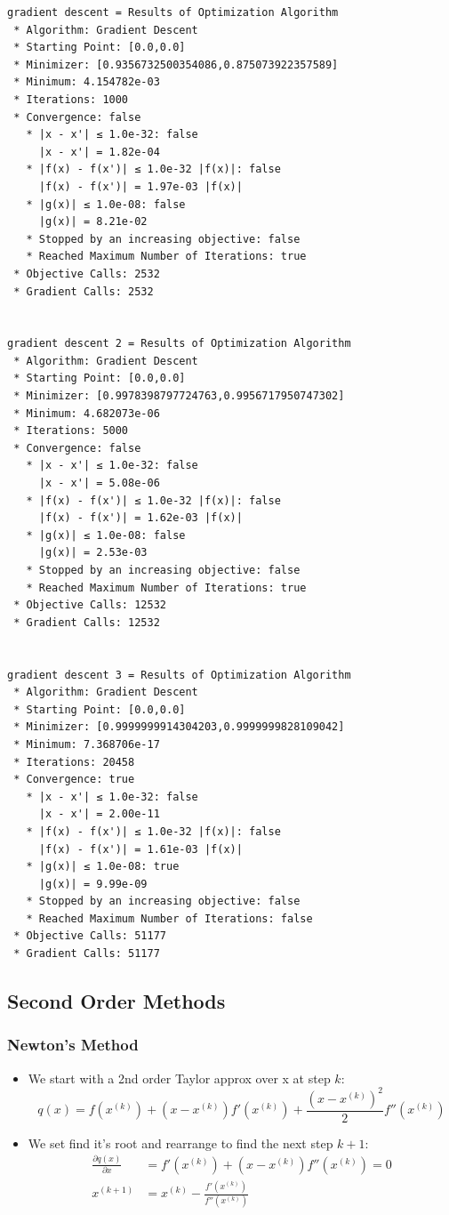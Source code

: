 \documentclass[11pt]{article}
\providecommand{\tightlist}{%
      \setlength{\itemsep}{0pt}\setlength{\parskip}{0pt}}
\begin{document}
    \begin{Verbatim}[commandchars=\\\{\}]
gradient descent = Results of Optimization Algorithm
 * Algorithm: Gradient Descent
 * Starting Point: [0.0,0.0]
 * Minimizer: [0.9356732500354086,0.875073922357589]
 * Minimum: 4.154782e-03
 * Iterations: 1000
 * Convergence: false
   * |x - x'| ≤ 1.0e-32: false 
     |x - x'| = 1.82e-04 
   * |f(x) - f(x')| ≤ 1.0e-32 |f(x)|: false
     |f(x) - f(x')| = 1.97e-03 |f(x)|
   * |g(x)| ≤ 1.0e-08: false 
     |g(x)| = 8.21e-02 
   * Stopped by an increasing objective: false
   * Reached Maximum Number of Iterations: true
 * Objective Calls: 2532
 * Gradient Calls: 2532


gradient descent 2 = Results of Optimization Algorithm
 * Algorithm: Gradient Descent
 * Starting Point: [0.0,0.0]
 * Minimizer: [0.9978398797724763,0.9956717950747302]
 * Minimum: 4.682073e-06
 * Iterations: 5000
 * Convergence: false
   * |x - x'| ≤ 1.0e-32: false 
     |x - x'| = 5.08e-06 
   * |f(x) - f(x')| ≤ 1.0e-32 |f(x)|: false
     |f(x) - f(x')| = 1.62e-03 |f(x)|
   * |g(x)| ≤ 1.0e-08: false 
     |g(x)| = 2.53e-03 
   * Stopped by an increasing objective: false
   * Reached Maximum Number of Iterations: true
 * Objective Calls: 12532
 * Gradient Calls: 12532


gradient descent 3 = Results of Optimization Algorithm
 * Algorithm: Gradient Descent
 * Starting Point: [0.0,0.0]
 * Minimizer: [0.9999999914304203,0.9999999828109042]
 * Minimum: 7.368706e-17
 * Iterations: 20458
 * Convergence: true
   * |x - x'| ≤ 1.0e-32: false 
     |x - x'| = 2.00e-11 
   * |f(x) - f(x')| ≤ 1.0e-32 |f(x)|: false
     |f(x) - f(x')| = 1.61e-03 |f(x)|
   * |g(x)| ≤ 1.0e-08: true 
     |g(x)| = 9.99e-09 
   * Stopped by an increasing objective: false
   * Reached Maximum Number of Iterations: false
 * Objective Calls: 51177
 * Gradient Calls: 51177

    \end{Verbatim}

    \subsection{Second Order Methods}\label{second-order-methods}

\subsubsection{Newton's Method}\label{newtons-method}

\begin{itemize}
\tightlist
\item
  We start with a 2nd order Taylor approx over x at step \(k\):
  \[q(x) = f(x^{(k)}) + (x - x^{(k)}) f'(x^{(k)}) + \frac{(x - x^{(k)})^2}{2}f''(x^{(k)})\]
\item
  We set find it's root and rearrange to find the next step \(k+1\): \[
  \begin{aligned}
  \frac{\partial q(x)}{\partial x} &= f'(x^{(k)}) + (x - x^{(k)}) f''(x^{(k)}) = 0 \\
  x^{(k+1)} &= x^{(k)} - \frac{f'(x^{(k)})}{f''(x^{(k)})}
  \end{aligned}
  \]
\end{itemize}
\end{document}
